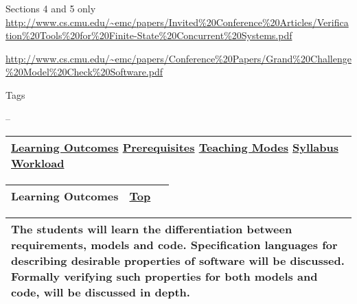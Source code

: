 \protect\hypertarget{ctl00_ctl00_ContentPlaceHolder1_ContentPlaceHolder1_LV_ctrl0_LV_Weblink_ctrl2_lcWebRatings}{}{}

\protect\hypertarget{ctl00_ctl00_ContentPlaceHolder1_ContentPlaceHolder1_LV_ctrl0_LV_Weblink_ctrl3_lblDesc}{}{Sections
4 and 5 only}
\href{javascript:__doPostBack('ctl00$ctl00$ContentPlaceHolder1$ContentPlaceHolder1$LV$ctrl0$LV_Weblink$ctrl3$lbView','')}{\\
http://www.cs.cmu.edu/\textasciitilde{}emc/papers/Invited\%20Conference\%20Articles/Verification\%20Tools\%20for\%20Finite-State\%20Concurrent\%20Systems.pdf}

\protect\hypertarget{ctl00_ctl00_ContentPlaceHolder1_ContentPlaceHolder1_LV_ctrl0_LV_Weblink_ctrl3_lcWebRatings}{}{}

\protect\hypertarget{ctl00_ctl00_ContentPlaceHolder1_ContentPlaceHolder1_LV_ctrl0_LV_Weblink_ctrl4_lblDesc}{}{}
\href{javascript:__doPostBack('ctl00$ctl00$ContentPlaceHolder1$ContentPlaceHolder1$LV$ctrl0$LV_Weblink$ctrl4$lbView','')}{http://www.cs.cmu.edu/\textasciitilde{}emc/papers/Conference\%20Papers/Grand\%20Challenge\%20Model\%20Check\%20Software.pdf}

\protect\hypertarget{ctl00_ctl00_ContentPlaceHolder1_ContentPlaceHolder1_LV_ctrl0_LV_Weblink_ctrl4_lcWebRatings}{}{}

\protect\hypertarget{ctl00_ctl00_ContentPlaceHolder1_ContentPlaceHolder1_LV_ctrl0_Label4}{}{Tags}

\protect\hypertarget{ctl00_ctl00_ContentPlaceHolder1_ContentPlaceHolder1_LV_ctrl0_lblTags}{}{--}

\begin{longtable}[]{@{}l@{}}
\toprule
\protect\hypertarget{ctl00_ctl00_ContentPlaceHolder1_ContentPlaceHolder1_lblSectionMiddle}{}{\protect\hyperlink{Learningux5cux2520Outcomes}{Learning
Outcomes} \textbar{} \protect\hyperlink{Prerequisites}{Prerequisites}
\textbar{} \protect\hyperlink{Teachingux5cux2520Modes}{Teaching Modes}
\textbar{} \protect\hyperlink{Syllabus}{Syllabus} \textbar{}
\protect\hyperlink{Workload}{Workload}}\tabularnewline
\bottomrule
\end{longtable}

{ }

\begin{longtable}[]{@{}ll@{}}
\toprule
{\protect\hypertarget{Learningux20Outcomes}{}{}Learning Outcomes} &
{\protect\hyperlink{top}{Top}~~}\tabularnewline
\bottomrule
\end{longtable}

\begin{longtable}[]{@{}l@{}}
\toprule
\protect\hypertarget{ctl00_ctl00_ContentPlaceHolder1_ContentPlaceHolder1_LV_CourseInfo_ctrl0_lblCourseInfo}{}{The
students will learn the differentiation between requirements, models and
code. Specification languages for describing desirable properties of
software will be discussed. Formally verifying such properties for both
models and code, will be discussed in depth.}\tabularnewline
\bottomrule
\end{longtable}

